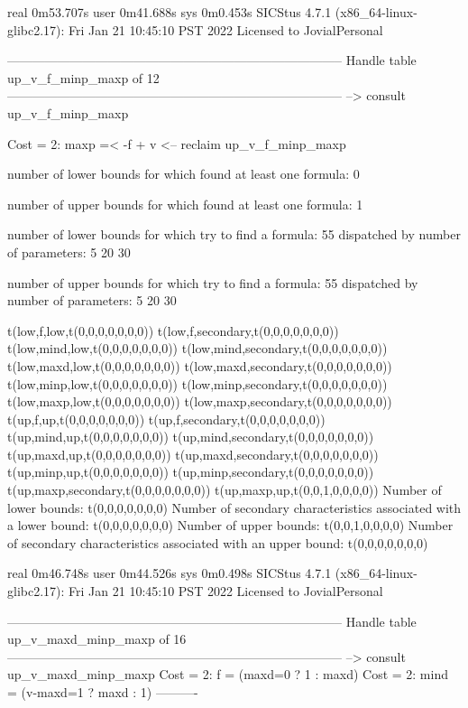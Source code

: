 real	0m53.707s
user	0m41.688s
sys	0m0.453s
SICStus 4.7.1 (x86_64-linux-glibc2.17): Fri Jan 21 10:45:10 PST 2022
Licensed to JovialPersonal


--------------------------------------------------------------------------------
Handle table up_v_f_minp_maxp of 12
--------------------------------------------------------------------------------
--> consult up_v_f_minp_maxp

Cost =  2:  maxp =< -f + v
<-- reclaim up_v_f_minp_maxp

number of lower bounds for which found at least one formula: 0

number of upper bounds for which found at least one formula: 1

number of lower bounds for which try to find a formula: 55
dispatched by number of parameters: 5  20  30

number of upper bounds for which try to find a formula: 55
dispatched by number of parameters: 5  20  30

t(low,f,low,t(0,0,0,0,0,0,0))
t(low,f,secondary,t(0,0,0,0,0,0,0))
t(low,mind,low,t(0,0,0,0,0,0,0))
t(low,mind,secondary,t(0,0,0,0,0,0,0))
t(low,maxd,low,t(0,0,0,0,0,0,0))
t(low,maxd,secondary,t(0,0,0,0,0,0,0))
t(low,minp,low,t(0,0,0,0,0,0,0))
t(low,minp,secondary,t(0,0,0,0,0,0,0))
t(low,maxp,low,t(0,0,0,0,0,0,0))
t(low,maxp,secondary,t(0,0,0,0,0,0,0))
t(up,f,up,t(0,0,0,0,0,0,0))
t(up,f,secondary,t(0,0,0,0,0,0,0))
t(up,mind,up,t(0,0,0,0,0,0,0))
t(up,mind,secondary,t(0,0,0,0,0,0,0))
t(up,maxd,up,t(0,0,0,0,0,0,0))
t(up,maxd,secondary,t(0,0,0,0,0,0,0))
t(up,minp,up,t(0,0,0,0,0,0,0))
t(up,minp,secondary,t(0,0,0,0,0,0,0))
t(up,maxp,secondary,t(0,0,0,0,0,0,0))
t(up,maxp,up,t(0,0,1,0,0,0,0))
Number of lower bounds:                                             t(0,0,0,0,0,0,0)
Number of secondary characteristics associated with a lower bound:  t(0,0,0,0,0,0,0)
Number of upper bounds:                                             t(0,0,1,0,0,0,0)
Number of secondary characteristics associated with an upper bound: t(0,0,0,0,0,0,0)

real	0m46.748s
user	0m44.526s
sys	0m0.498s
SICStus 4.7.1 (x86_64-linux-glibc2.17): Fri Jan 21 10:45:10 PST 2022
Licensed to JovialPersonal


--------------------------------------------------------------------------------
Handle table up_v_maxd_minp_maxp of 16
--------------------------------------------------------------------------------
--> consult up_v_maxd_minp_maxp
Cost =  2:  f    = (maxd=0 ? 1 : maxd)
Cost =  2:  mind = (v-maxd=1 ? maxd : 1)
----------

